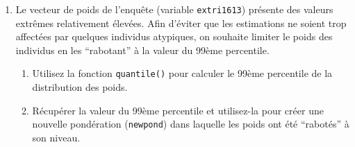 \documentclass[12pt,twosided, notitlepage]{book}
\newenvironment{Shaded}{}{}
\newcommand{\KeywordTok}[1]{\textcolor[rgb]{0.00,0.00,1.00}{{#1}}}
\newcommand{\DataTypeTok}[1]{{#1}}
\newcommand{\FloatTok}[1]{{#1}}
\newcommand{\StringTok}[1]{\textcolor[rgb]{0.00,0.50,0.50}{{#1}}}
\newcommand{\CommentTok}[1]{\textcolor[rgb]{0.00,0.50,0.00}{{#1}}}
\newcommand{\NormalTok}[1]{{#1}}
\newif \ifsol
\renewenvironment{Shaded}{\begin{snugshade}}{\end{snugshade}}
\begin{document}
\begin{enumerate}
\begin{enumerate}
    \begin{center} \rule{0.5\linewidth}{\linethickness}\end{center}

    \bigskip  \fi 
  \end{enumerate}
\item
  Le vecteur de poids de l'enquête (variable \texttt{extri1613})
  présente des valeurs extrêmes relativement élevées. Afin d'éviter que
  les estimations ne soient trop affectées par quelques individus
  atypiques, on souhaite limiter le poids des individus en les
  \enquote{rabotant} à la valeur du 99ème percentile.

  \begin{enumerate}
  \def\labelenumii{\roman{enumii}.}
  \item
    Utilisez la fonction \texttt{quantile()} pour calculer le 99ème
    percentile de la distribution des poids.

    \ifsol 

    \begin{center} \rule{0.5\linewidth}{\linethickness}\end{center}

\begin{Shaded}
\begin{Highlighting}[]
\CommentTok{# La fonction quantile() calcule les quantiles d'une distribution}
\KeywordTok{quantile}\NormalTok{(eec$extri1613)}
  \NormalTok{##         0%
  \NormalTok{##   156.3798  1088.2021  1334.5818  1636.7540 25347.1387}

\CommentTok{# Pour récupérer un quantile en particulier, on utilise l'argument}
\CommentTok{# probs }
\NormalTok{seuil <-}\StringTok{ }\KeywordTok{quantile}\NormalTok{(eec$extri1613, }\DataTypeTok{probs =} \FloatTok{0.99}\NormalTok{)}
\NormalTok{seuil}
  \NormalTok{##      99%
  \NormalTok{## 3958.567}
\end{Highlighting}
\end{Shaded}

    \begin{center} \rule{0.5\linewidth}{\linethickness}\end{center}

    \bigskip  \fi 
  \item
    Récupérer la valeur du 99ème percentile et utilisez-la pour créer
    une nouvelle pondération (\texttt{newpond}) dans laquelle les poids
    ont été \enquote{rabotés} à son niveau.


\end{enumerate}
\end{enumerate}
\end{document}
